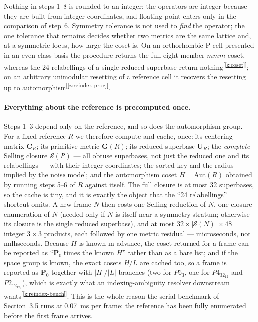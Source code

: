 \documentclass[11pt]{article}
\newcommand{\Gmet}{\mathbf{G}}
\newcommand{\Pop}{\mathbf{P}}
\newcommand{\Uop}{\mathbf{U}}
\newcommand{\Sclosure}{\mathcal{S}}
\newcommand{\chk}[1]{\textsuperscript{[\ref{#1}]}}
\begin{document}
Nothing in steps 1--8 is rounded to an integer; the operators are integer because they are built from integer coordinates, and floating point enters only in the comparison of step~6. Symmetry tolerance is not used to \emph{find} the operator; the one tolerance that remains decides whether two metrics are the same lattice and, at a symmetric locus, how large the coset is. On an orthorhombic P cell presented in an even-class basis the procedure returns the full eight-member $mmm$ coset, whereas the 24 relabellings of a single reduced superbase return nothing\chk{z:coset}; on an arbitrary unimodular resetting of a reference cell it recovers the resetting up to automorphism\chk{z:reindex-proc}.

\paragraph{Everything about the reference is precomputed once.}
Steps 1--3 depend only on the reference, and so does the automorphism group. For a fixed reference $R$ we therefore compute and cache, once: its centering matrix $\mathbf C_R$; its primitive metric $\Gmet(R)$; its reduced superbase $\Uop_R$; the \emph{complete} Selling closure $\Sclosure(R)$ --- all obtuse superbases, not just the reduced one and its relabellings --- with their integer coordinates; the sorted key and the radius implied by the noise model; and the automorphism coset $H=\mathrm{Aut}(R)$ obtained by running steps 5--6 of $R$ against itself. The full closure is at most 32 superbases, so the cache is tiny, and it is exactly the object that the ``24 relabellings'' shortcut omits. A new frame $N$ then costs one Selling reduction of $N$, one closure enumeration of $N$ (needed only if $N$ is itself near a symmetry stratum; otherwise its closure is the single reduced superbase), and at most $32\times|\Sclosure(N)|\times48$ integer $3\times3$ products, each followed by one metric residual --- microseconds, not milliseconds. Because $H$ is known in advance, the coset returned for a frame can be reported as ``$\Pop_0$ times the known $H$'' rather than as a bare list; and if the space group is known, the exact cosets $H/L$ are cached too, so a frame is reported as $\Pop_0$ together with $|H|/|L|$ branches (two for $P6_3$, one for $P4_32_12$ and $P2_12_12_1$), which is exactly what an indexing-ambiguity resolver downstream wants\chk{z:reindex-bench}. This is the whole reason the serial benchmark of Section~3.5 runs at \SI{0.07}{\milli\second} per frame: the reference has been fully enumerated before the first frame arrives.
\end{document}
